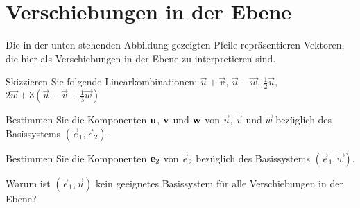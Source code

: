 \documentclass{scrartcl}
\newcommand{\uu}{\vec{u}}
\newcommand{\vv}{\vec{v}}
\newcommand{\ww}{\vec{w}}
\newcommand{\ee}{\vec{e}}
\begin{document}
\section{Verschiebungen in der Ebene}
Die in der unten stehenden Abbildung gezeigten Pfeile repräsentieren Vektoren, die hier als Verschiebungen in der Ebene zu interpretieren sind.
\begin{subex}
  \item Skizzieren Sie folgende Linearkombinationen: $\uu + \vv$, $\uu - \ww$, $\frac{1}{2}\uu$, $2\ww + 3(\uu + \vv + \frac{1}{3}\ww)$
  \item Bestimmen Sie die Komponenten $\mathbf{u}$, $\mathbf{v}$ und $\mathbf{w}$ von $\uu$, $\vv$ und $\ww$ bezüglich des Basissystems $(\ee_1, \ee_2)$.
  \item Bestimmen Sie die Komponenten $\mathbf{e}_2$ von $\ee_2$ bezüglich des Basissystems $(\ee_1, \ww)$.
  \item Warum ist $(\ee_1, \uu)$ kein geeignetes Basissystem für alle Verschiebungen in der Ebene? 
\end{subex}
\begin{center}
\end{center}
\end{document}
